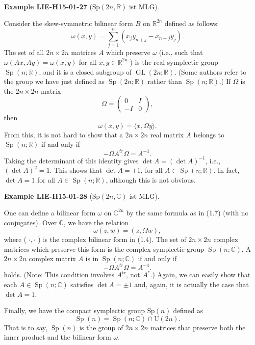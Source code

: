\documentclass[10pt, letterpaper]{article}
\newcommand{\R}{\mathbb{R}}
\newcommand{\C}{\mathbb{C}}
\newcommand{\Sp}{\mathrm{Sp}}
\newcommand{\CustomHeading}[3]{%
  \par\medskip\noindent%
  \textbf{#1 #2} \textnormal{(#3)}.\enskip%
}
\newenvironment{EXA}[2]{\begin{unitbox}\CustomHeading{Example}{#1}{#2}}{\end{unitbox}}
\begin{document}
\begin{EXA}{LIE-H15-01-27}{$\Sp(2n,\R)$ ist MLG}
Consider the skew-symmetric bilinear form $B$ on $\mathbb{R}^{2 n}$ defined as follows:
$$
\omega(x, y)=\sum_{j=1}^{n}\left(x_{j} y_{n+j}-x_{n+j} y_{j}\right) .
$$
The set of all $2 n \times 2 n$ matrices $A$ which preserve $\omega$ (i.e., such that $\omega(A x, A y)= \omega(x, y)$ for all $x, y \in \mathbb{R}^{2 n}$ ) is the real symplectic group $\operatorname{Sp}(n ; \mathbb{R})$, and it is a closed subgroup of $\operatorname{GL}(2 n ; \mathbb{R})$. (Some authors refer to the group we have just defined as $\operatorname{Sp}(2 n ; \mathbb{R})$ rather than $\operatorname{Sp}(n ; \mathbb{R})$.) If $\Omega$ is the $2 n \times 2 n$ matrix
$$
\Omega=\left(\begin{array}{cc}
0 & I \\
-I & 0
\end{array}\right),
$$
then
$$
\omega(x, y)=\langle x, \Omega y\rangle .
$$
From this, it is not hard to show that a $2 n \times 2 n$ real matrix $A$ belongs to $\operatorname{Sp}(n ; \mathbb{R})$ if and only if
$$
-\Omega A^{t r} \Omega=A^{-1} .
$$
Taking the determinant of this identity gives $\operatorname{det} A=(\operatorname{det} A)^{-1}$, i.e., $(\operatorname{det} A)^{2}=1$. This shows that $\operatorname{det} A= \pm 1$, for all $A \in \operatorname{Sp}(n ; \mathbb{R})$. In fact, $\operatorname{det} A=1$ for all $A \in \operatorname{Sp}(n ; \mathbb{R})$, although this is not obvious.
\end{EXA}

\begin{EXA}{LIE-H15-01-28}{$\Sp(2n,\C)$ ist MLG}
One can define a bilinear form $\omega$ on $\mathbb{C}^{2 n}$ by the same formula as in (1.7) (with no conjugates). Over $\mathbb{C}$, we have the relation
$$
\omega(z, w)=(z, \Omega w),
$$
where ( $\cdot, \cdot$ ) is the complex bilinear form in (1.4). The set of $2 n \times 2 n$ complex matrices which preserve this form is the complex symplectic group $\operatorname{Sp}(n ; \mathbb{C})$. A $2 n \times 2 n$ complex matrix $A$ is in $\operatorname{Sp}(n ; \mathbb{C})$ if and only if
$$
-\Omega A^{t r} \Omega=A^{-1} .
$$
holds. (Note: This condition involves $A^{t r}$, not $A^{*}$.) Again, we can easily show that each $A \in \operatorname{Sp}(n ; \mathbb{C})$ satisfies $\operatorname{det} A= \pm 1$ and, again, it is actually the case that $\operatorname{det} A=1$.
\end{EXA}


Finally, we have the compact symplectic group $\mathrm{Sp}(n)$ defined as
$$
\operatorname{Sp}(n)=\operatorname{Sp}(n ; \mathbb{C}) \cap \mathrm{U}(2 n) .
$$
That is to say, $\operatorname{Sp}(n)$ is the group of $2 n \times 2 n$ matrices that preserve both the inner product and the bilinear form $\omega$.
\end{document}
